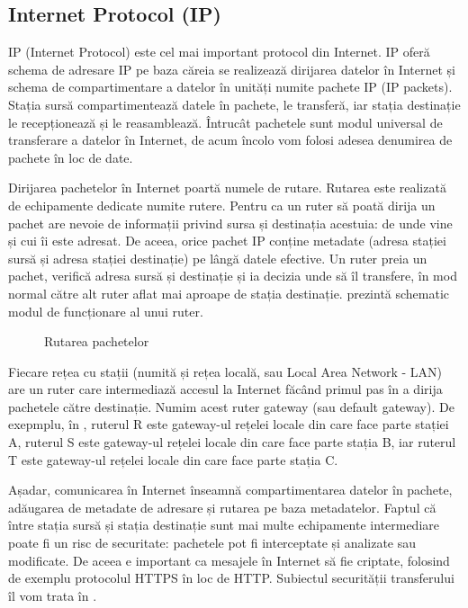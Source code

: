 \subsection{Internet Protocol (IP)}
\label{sec:net:ip}

IP (Internet Protocol) este cel mai important protocol din Internet. IP oferă schema de adresare IP pe baza căreia se realizează dirijarea datelor în Internet și schema de compartimentare a datelor în unități numite pachete IP (IP packets). Stația sursă compartimentează datele în pachete, le transferă, iar stația destinație le recepționează și le reasamblează. Întrucât pachetele sunt modul universal de transferare a datelor în Internet, de acum încolo vom folosi adesea denumirea de pachete în loc de date.

Dirijarea pachetelor în Internet poartă numele de rutare. Rutarea este realizată de echipamente dedicate numite rutere. Pentru ca un ruter să poată dirija un pachet are nevoie de informații privind sursa și destinația acestuia: de unde vine și cui îi este adresat. De aceea, orice pachet IP conține metadate (adresa stației sursă și adresa stației destinație) pe lângă datele efective. Un ruter preia un pachet, verifică adresa sursă și destinație și ia decizia unde să îl transfere, în mod normal către alt ruter aflat mai aproape de stația destinație.  prezintă schematic modul de funcționare al unui ruter.

\begin{figure}[htbp]
  \centering
  \def\svgwidth{\columnwidth}
  
  \caption{Rutarea pachetelor}
  \label{fig:net:routing}
\end{figure}

Fiecare rețea cu stații (numită și rețea locală, sau Local Area Network - LAN) are un ruter care intermediază accesul la Internet făcând primul pas în a dirija pachetele către destinație. Numim acest ruter gateway (sau default gateway). De exepmplu, în , ruterul R este gateway-ul rețelei locale din care face parte stației A, ruterul S este gateway-ul rețelei locale din care face parte stația B, iar ruterul T este gateway-ul rețelei locale din care face parte stația C.

Așadar, comunicarea în Internet înseamnă compartimentarea datelor în pachete, adăugarea de metadate de adresare și rutarea pe baza metadatelor. Faptul că între stația sursă și stația destinație sunt mai multe echipamente intermediare poate fi un risc de securitate: pachetele pot fi interceptate și analizate sau modificate. De aceea e important ca mesajele în Internet să fie criptate, folosind de exemplu protocolul HTTPS în loc de HTTP. Subiectul securității transferului îl vom trata în .

